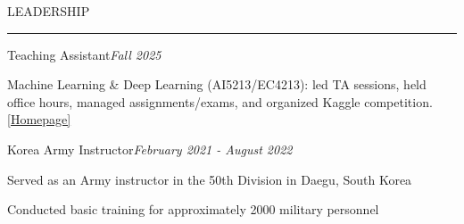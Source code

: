 \documentclass{resume} %
\renewenvironment{rSection}[2][]{
\vspace{-0.5 em} %
\sectionskip
\noindent\textcolor{RoyalPurple}{\MakeUppercase{#2}}\hfill{\footnotesize #1}\par
\sectionlineskip
\hrule
\begin{list}{}{
\setlength{\leftmargin}{1.5em}
}
\item[]
}{
\end{list}
}
\begin{document}
\begin{rSection}{Leadership}

\begin{rSubsection}{Teaching Assistant}{\em Fall 2025}{}{}
\vspace{-0.3 em}
\item Machine Learning \& Deep Learning (AI5213/EC4213): led TA sessions, held office hours, managed assignments/exams, and organized Kaggle competition. \href{https://sundong.kim/courses/mldl25f/}{[Homepage]}
\end{rSubsection}

\vspace{-0.75 em}

\begin{rSubsection}{Korea Army Instructor}{\em February 2021 - August 2022}{}{}
\vspace{-0.3 em}
\item Served as an Army instructor in the 50th Division in Daegu, South Korea
\item Conducted basic training for approximately 2000 military personnel 
\end{rSubsection}

\end{rSection}



\end{document}

